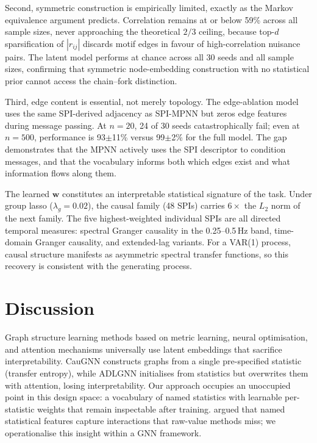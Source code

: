 \documentclass{article}
\theoremstyle{plain}
\begin{document}
Second, symmetric construction is empirically limited, exactly as the Markov equivalence argument predicts. Correlation remains at or below 59\% across all sample sizes, never approaching the theoretical $2/3$ ceiling, because top-$d$ sparsification of $|r_{ij}|$ discards motif edges in favour of high-correlation nuisance pairs. The latent model performs at chance across all 30 seeds and all sample sizes, confirming that symmetric node-embedding construction with no statistical prior cannot access the chain--fork distinction.

Third, edge content is essential, not merely topology. The edge-ablation model uses the same SPI-derived adjacency as SPI-MPNN but zeros edge features during message passing. At $n{=}20$, 24 of 30 seeds catastrophically fail; even at $n{=}500$, performance is 93$\pm$11\% versus 99$\pm$2\% for the full model. The gap demonstrates that the MPNN actively uses the SPI descriptor to condition messages, and that the vocabulary informs both which edges exist and what information flows along them.

The learned $\mathbf{w}$ constitutes an interpretable statistical signature of the task. Under group lasso ($\lambda_g{=}0.02$), the causal family (48 SPIs) carries $6\times$ the $L_2$ norm of the next family. The five highest-weighted individual SPIs are all directed temporal measures: spectral Granger causality in the 0.25--0.5\,Hz band, time-domain Granger causality, and extended-lag variants. For a VAR(1) process, causal structure manifests as asymmetric spectral transfer functions, so this recovery is consistent with the generating process.

\section{Discussion}
\label{sec:discussion}

Graph structure learning methods based on metric learning, neural optimisation, and attention mechanisms \citep{zhu2021} universally use latent embeddings that sacrifice interpretability. CauGNN \citep{duan2023} constructs graphs from a single pre-specified statistic (transfer entropy), while ADLGNN \citep{sriramulu2023} initialises from statistics but overwrites them with attention, losing interpretability. Our approach occupies an unoccupied point in this design space: a vocabulary of named statistics with learnable per-statistic weights that remain inspectable after training. \citet{nguyen2025} argued that named statistical features capture interactions that raw-value methods miss; we operationalise this insight within a GNN framework.
\end{document}
